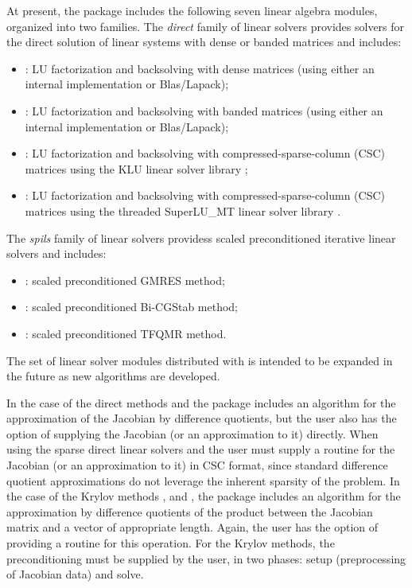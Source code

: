 At present, the package includes the following seven {\kinsol} linear algebra
modules, organized into two families. The {\em direct} family of linear
solvers provides solvers for the direct solution of linear systems with
dense or banded matrices and includes:
\begin{itemize} 
\item {\kindense}: LU factorization and backsolving with dense matrices
  (using either an internal implementation or Blas/Lapack); 
\item {\kinband}: LU factorization and backsolving with banded matrices
  (using either an internal implementation or Blas/Lapack); 
\item {\kinklu}: LU factorization and backsolving with
  compressed-sparse-column (CSC) matrices using the KLU linear solver
  library \cite{KLU_site};
\item {\kinsuperlumt}: LU factorization and backsolving with
  compressed-sparse-column (CSC) matrices using the threaded
  SuperLU\_MT linear solver library \cite{SuperLUMT_site}.
\end{itemize}
The {\em spils} family of linear solvers providess scaled preconditioned
iterative linear solvers and includes:
\begin{itemize} 
\item {\kinspgmr}: scaled preconditioned GMRES method;
\item {\kinspbcg}: scaled preconditioned Bi-CGStab method;
\item {\kinsptfqmr}: scaled preconditioned TFQMR method.
\end{itemize}
The set of linear solver modules distributed with {\kinsol} is intended to be expanded in the
future as new algorithms are developed.

In the case of the direct methods {\kindense} and {\kinband}
the package includes an algorithm for the approximation of the Jacobian by difference quotients, but
the user also has the option of supplying the Jacobian (or an approximation to it)
directly.  When using the sparse direct linear solvers {\kinklu} and
{\kinsuperlumt} the user must supply a routine for the Jacobian (or an
approximation to it) in CSC format, since standard difference quotient
approximations do not leverage the inherent sparsity of the problem.
In the case of the Krylov methods {\kinspgmr}, {\kinspbcg} and {\kinsptfqmr},
the package includes an algorithm for the approximation by difference quotients of the
product between the Jacobian matrix and a vector of appropriate length. Again, the user
has the option of providing a routine for this operation.
For the Krylov methods, 
the preconditioning must be supplied by the user, in two phases:
setup (preprocessing of Jacobian data) and solve.


